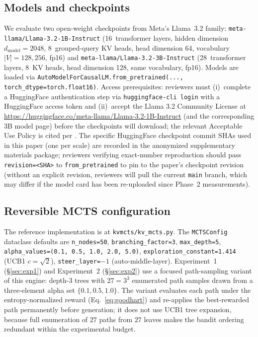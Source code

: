 \documentclass{article}
\begin{document}
\subsection{Models and checkpoints}
We evaluate two open-weight checkpoints from Meta's Llama~3.2 family: \texttt{meta-llama/Llama-3.2-1B-Instruct} (16~transformer layers, hidden dimension $d_{\text{model}} = 2048$, 8~grouped-query KV heads, head dimension 64, vocabulary $|V| = 128{,}256$, fp16) and \texttt{meta-llama/Llama-3.2-3B-Instruct} (28~transformer layers, 8~KV heads, head dimension 128, same vocabulary, fp16). Models are loaded via \texttt{AutoModelForCausalLM.from\_pretrained(..., torch\_dtype=torch.float16)}. Access prerequisites: reviewers must (i)~complete a HuggingFace authentication step via \texttt{huggingface-cli login} with a HuggingFace access token and (ii)~accept the Llama 3.2 Community License at \url{https://huggingface.co/meta-llama/Llama-3.2-1B-Instruct} (and the corresponding 3B model page) before the checkpoints will download; the relevant Acceptable Use Policy is cited per \cite{meta2024llama3_2_aup}. The specific HuggingFace checkpoint commit SHAs used in this paper (one per scale) are recorded in the anonymized supplementary materials package; reviewers verifying exact-number reproduction should pass \texttt{revision=<SHA>} to \texttt{from\_pretrained} to pin to the paper's checkpoint revision (without an explicit revision, reviewers will pull the current \texttt{main} branch, which may differ if the model card has been re-uploaded since Phase~2 measurements).

\subsection{Reversible MCTS configuration}
The reference implementation is at \texttt{kvmcts/kv\_mcts.py}. The \texttt{MCTSConfig} dataclass defaults are \texttt{n\_nodes=50}, \texttt{branching\_factor=3}, \texttt{max\_depth=5}, \texttt{alpha\_values=(0.1, 0.5, 1.0, 2.0, 5.0)}, \texttt{exploration\_constant=1.414} (UCB1 $c = \sqrt{2}$), \texttt{steer\_layer=$-1$} (auto-middle-layer). Experiment~1 (§\ref{sec:exp1}) and Experiment~2 (§\ref{sec:exp2}) use a focused path-sampling variant of this engine: depth-$3$ trees with $27 = 3^3$ enumerated path samples drawn from a three-element alpha set $\{0.1, 0.5, 1.0\}$. The variant evaluates each path under the entropy-normalized reward (Eq.~\ref{eq:goodhart}) and re-applies the best-rewarded path permanently before generation; it does not use UCB1 tree expansion, because full enumeration of $27$ paths from $27$ leaves makes the bandit ordering redundant within the experimental budget.
\end{document}
